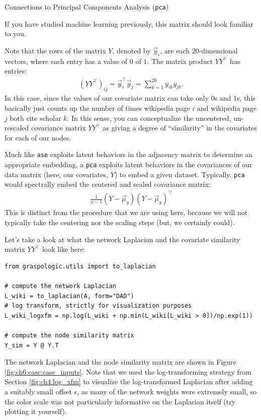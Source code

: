 \begin{floatingbox}\caption{Connections to Principal Components Analysis (\texttt{pca})}
\label{box:ch6:casc:pca}
If you have studied machine learning previously, this matrix should look familiar to you.

Note that the rows of the matrix $Y$, denoted by $\vec y_i$, are each $20$-dimensional vectors, where each entry has a value of $0$ of $1$. The matrix product $YY^\top$ has entries:
\begin{align*}
    (YY^\top)_{ij} = \vec y_i^\top \vec y_j = \sum_{k = 1}^{20} y_{ik}y_{jk}.
\end{align*}
In this case, since the values of our covariate matrix can take only $0$s and $1$s, this basically just counts up the number of times wikipedia page $i$ and wikipedia page $j$ both cite scholar $k$. In this sense, you can conceptualize the uncentered, un-rescaled covariance matrix $YY^\top$ as giving a degree of ``similarity'' in the covariates for each of our nodes. 

Much like \texttt{ase} exploits latent behaviors in the adjacency matrix to determine an appropriate embedding, a \texttt{pca} exploits latent behaviors in the covariances of our data matrix (here, our covariates, $Y$) to embed a given dataset. Typically, \texttt{pca} would spectrally embed the centered and scaled covariance matrix:
\begin{align*}
    \frac{1}{n - 1}\left(Y - \vec \mu_y\right)\left(Y - \vec \mu_y\right)^\top
\end{align*}
This is distinct from the procedure that we are using here, because we will not typically take the centering nor the scaling steps (but, we certainly could).
\end{floatingbox}

Let's take a look at what the network Laplacian and the covariate similarity matrix $YY^\top$ look like here:

\begin{lstlisting}[style=python]
from graspologic.utils import to_laplacian

# compute the network Laplacian
L_wiki = to_laplacian(A, form="DAD")
# log transform, strictly for visualization purposes
L_wiki_logxfm = np.log(L_wiki + np.min(L_wiki[L_wiki > 0])/np.exp(1))

# compute the node similarity matrix
Y_sim = Y @ Y.T
\end{lstlisting}

The network Laplacian and the node similarity matrix are shown in Figure \ref{fig:ch6:casc:casc_inputs}. Note that we used the log-transforming strategy from Section \ref{fig:ch4:log_xfm} to visualize the log-transformed Laplacian after adding a suitably small offset $\epsilon$, as many of the network weights were extremely small, so the color scale was not particularly informative on the Laplacian itself (try plotting it yourself).

